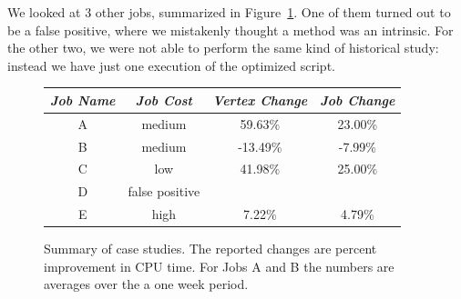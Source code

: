 We looked at 3 other jobs, summarized in Figure~\ref{fig:caseStudySummary}.
One of them turned out to be a false positive, where we mistakenly thought a method was an intrinsic.
For the other two, we were not able to perform the same kind of historical study: instead we have just one execution of the optimized script.
\begin{figure}[ht]
\begin{tabular}{c|c|c|c} 
{\em Job Name} & {\em Job Cost} & {\em Vertex Change} & {\em Job Change} \\ \hline
A & medium & 59.63\%  & 23.00\% \\
B & medium & -13.49\% & -7.99\% \\
C & low    & 41.98\%  & 25.00\% \\
D & false positive & \\
E & high   & 7.22\%   & 4.79\%
\end{tabular}
\caption{Summary of case studies. The reported changes are percent improvement in CPU time.
For Jobs A and B the numbers are averages over the a one week period.
\label{fig:caseStudySummary}}
\end{figure}

